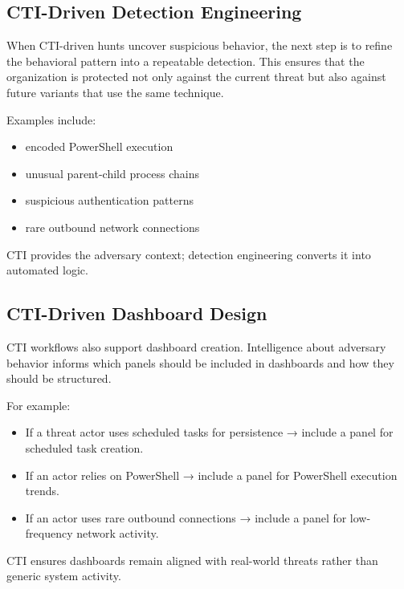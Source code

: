 \subsection*{CTI-Driven Detection Engineering}

When CTI-driven hunts uncover suspicious behavior, the next step is to refine the behavioral pattern into a repeatable 
detection. This ensures that the organization is protected not only against the current threat but also against future 
variants that use the same technique.

Examples include:

\begin{itemize}
    \item encoded PowerShell execution
    \item unusual parent-child process chains
    \item suspicious authentication patterns
    \item rare outbound network connections
\end{itemize}

CTI provides the adversary context; detection engineering converts it into automated logic.


\subsection*{CTI-Driven Dashboard Design}

CTI workflows also support dashboard creation. Intelligence about adversary behavior informs which panels should be 
included in dashboards and how they should be structured.

For example:

\begin{itemize}
    \item If a threat actor uses scheduled tasks for persistence → include a panel for scheduled task creation.
    \item If an actor relies on PowerShell → include a panel for PowerShell execution trends.
    \item If an actor uses rare outbound connections → include a panel for low-frequency network activity.
\end{itemize}

CTI ensures dashboards remain aligned with real-world threats rather than generic system activity.

